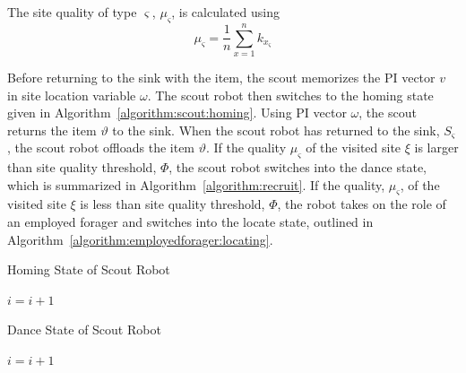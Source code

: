 The site quality of type $\varsigma$, $\mu_\varsigma$, is calculated using
\begin{equation}
\label{density}
\mu_\varsigma = \frac{1}{n}\sum\limits_{x=1}^n k_{x_\varsigma}
\end{equation}
 
Before returning to the sink with the item, the scout memorizes the PI vector $v$ in site location variable $\omega$. The scout robot then switches to the homing state given in Algorithm~\ref{algorithm:scout:homing}. Using PI vector $\omega$, the scout returns the item $\vartheta$ to the sink. When the scout robot has returned to the sink, $S_\varsigma$, the scout robot offloads the item $\vartheta$. If the quality $\mu_\varsigma$ of the visited site $\xi$ is larger than site quality threshold, $\Phi$, the scout robot switches into the dance state, which is summarized in Algorithm~\ref{algorithm:recruit}. If the quality, $\mu_\varsigma$, of the visited site $\xi$ is less than site quality threshold, $\Phi$, the robot takes on the role of an employed forager and switches into the locate state, outlined in Algorithm~\ref{algorithm:employedforager:locating}.


\begin{algorithm}
\caption{Homing State of Scout Robot}
\label{algorithm:scout:homing}
\begin{algorithmic}[1]
	\State {}
		\State {}
	\Else 
		\State {}
		\State {}
	\EndIf
\Else
		\State {}
	\EndIf
\EndIf
\State $i =i + 1$
\EndFunction
\end{algorithmic}
\end{algorithm}


\begin{algorithm}
\caption{Dance State of Scout Robot}
\label{algorithm:recruit}
\begin{algorithmic}[1]
	\State {} 
\Else 
	\State {}
	\If {$\varrho < \rho$} 
	\Else
	\EndIf
\EndIf
\State $i =i + 1$
\EndFunction
\end{algorithmic}
\end{algorithm}

